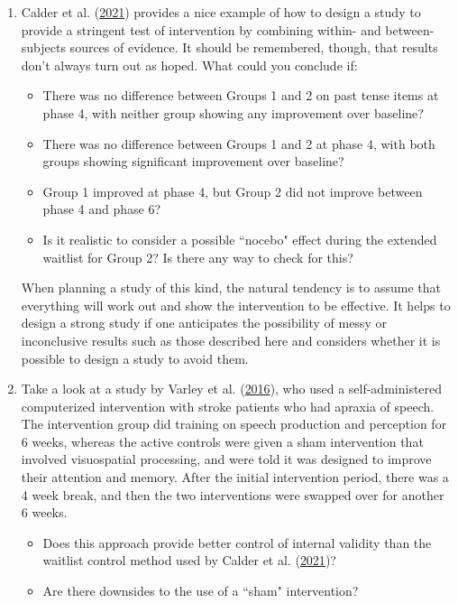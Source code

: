 \documentclass{krantz}
\providecommand{\tightlist}{%
\setlength{\itemsep}{0pt}\setlength{\parskip}{0pt}}
\begin{document}
\begin{enumerate}
\def\labelenumi{\arabic{enumi}.}
\tightlist
\item
  Calder et al. (\protect\hyperlink{ref-calder2021}{2021}) provides a nice example of how to design a study to provide a stringent test of intervention by combining within- and between-subjects sources of evidence. It should be remembered, though, that results don't always turn out as hoped. What could you conclude if:


\begin{itemize}
\tightlist
\item
  There was no difference between Groups 1 and 2 on past tense items at phase 4, with neither group showing any improvement over baseline?
\item
  There was no difference between Groups 1 and 2 at phase 4, with both groups showing significant improvement over baseline?
\item
  Group 1 improved at phase 4, but Group 2 did not improve between phase 4 and phase 6?
\item
  Is it realistic to consider a possible ``nocebo" effect during the extended waitlist for Group 2? Is there any way to check for this?
\end{itemize}

When planning a study of this kind, the natural tendency is to assume that everything will work out and show the intervention to be effective. It helps to design a strong study if one anticipates the possibility of messy or inconclusive results such as those described here and considers whether it is possible to design a study to avoid them.


\def\labelenumi{\arabic{enumi}.}
\setcounter{enumi}{1}
\tightlist
\item
  Take a look at a study by Varley et al. (\protect\hyperlink{ref-varley2016}{2016}), who used a self-administered computerized intervention with stroke patients who had apraxia of speech. The intervention group did training on speech production and perception for 6 weeks, whereas the active controls were given a sham intervention that involved visuospatial processing, and were told it was designed to improve their attention and memory. After the initial intervention period, there was a 4 week break, and then the two interventions were swapped over for another 6 weeks.


\begin{itemize}
\tightlist
\item
  Does this approach provide better control of internal validity than the waitlist control method used by Calder et al. (\protect\hyperlink{ref-calder2021}{2021})?
\item
  Are there downsides to the use of a ``sham" intervention?
\end{itemize}
\end{enumerate}
\end{document}
